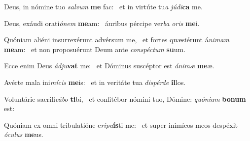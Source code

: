 \item Deus, in nómine tuo \textit{salvum} \textbf{me} fac:~\psstar{} et in virtúte tu\textit{a} \textit{júdi}\textbf{ca} me.
\item Deus, exáudi orati\textit{ónem} \textbf{me}am:~\psstar{} áuribus pércipe ver\textit{ba} \textit{oris} \textbf{me}i.
\item Quóniam aliéni insurrexérunt advérsum me,~\pscross{} et fortes quæsiérunt á\textit{nimam} \textbf{me}am:~\psstar{} et non proposuérunt Deum ante \textit{conspéctum} \textbf{su}um.
\item Ecce enim Deus \textit{ádju}\textbf{vat} me:~\psstar{} et Dóminus suscéptor est \textit{ánimæ} \textbf{me}æ.
\item Avérte mala ini\textit{mícis} \textbf{me}is:~\psstar{} et in veritáte tua \textit{dispérde} \textbf{il}los.
\item Voluntárie sacrifi\textit{cábo} \textbf{ti}bi,~\psstar{} et confitébor nómini tuo, Dómine: \textit{quóniam} \textbf{bo}\textbf{num} est:
\item Quóniam ex omni tribulatióne e\textit{ripu}\textbf{ís}ti me:~\psstar{} et super inimícos meos despéxit \textit{óculus} \textbf{me}us.
